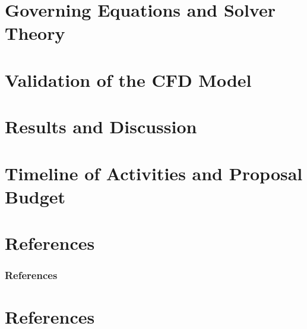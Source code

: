 \documentclass[dvipsnames, aspectratio=169]{beamer}
\begin{document}
\section{Governing Equations and Solver Theory}


\section{Validation of the CFD Model}


\section{Results and Discussion}


\section{Timeline of Activities and Proposal Budget}


\section{References}
\begin{frame}[allowframebreaks]
    \frametitle{References}
    
    
\end{frame}
    
\section{References}
\end{document}
